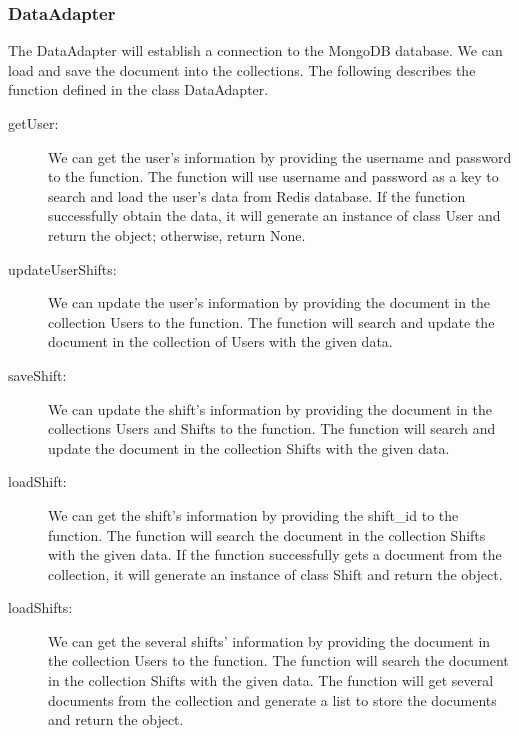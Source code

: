 \documentclass[11pt, oneside]{article}   	%
\begin{document}
\subsubsection{DataAdapter}
The DataAdapter will establish a connection to the MongoDB database. We can load and save the document into the collections. The following describes the function defined in the class DataAdapter.

\begin{description}
\item[getUser:]We can get the user’s information by providing the username and password to the function. The function will use username and password as a key to search and load the user's data from Redis database. If the function successfully obtain the data, it will generate an instance of class User and return the object; otherwise, return None.
\item[updateUserShifts:]We can update the user’s information by providing the document in the collection Users to the function. The function will search and update the document in the collection of Users with the given data.
\item[saveShift:]We can update the shift’s information by providing the document in the collections Users and Shifts to the function. The function will search and update the document in the collection Shifts with the given data.
\item[loadShift:]We can get the shift’s information by providing the shift\_id to the function. The function will search the document in the collection Shifts with the given data. If the function successfully gets a document from the collection, it will generate an instance of class Shift and return the object.
\item[loadShifts:]We can get the several shifts’ information by providing the document in the collection Users to the function. The function will search the document in the collection Shifts with the given data. The function will get several documents from the collection and generate a list to store the documents and return the object.
\end{description}
\end{document}
